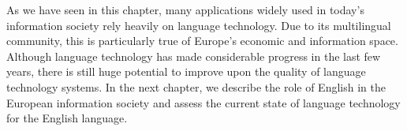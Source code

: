 \begin{multicols}{2}
As we have seen in this chapter, many applications widely used in today’s information society rely heavily on language technology. Due to its multilingual community, this is particularly true of Europe’s economic and information space. Although language technology has made considerable progress in the last few years, there is still huge potential to improve upon the quality of language technology systems. In the next chapter, we describe the role of English in the European information society and assess the current state of language technology for the English language.
\end{multicols}

\clearpage



